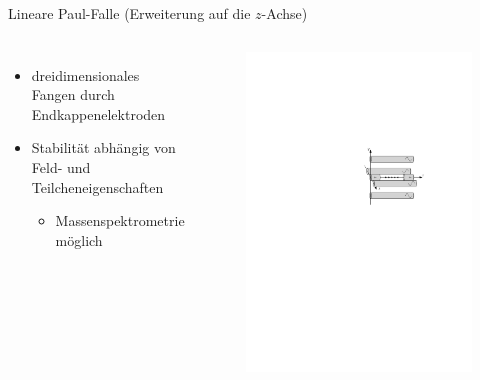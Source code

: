 \documentclass[12pt,xcolor=dvipsnames]{beamer}
\begin{document}
\begin{frame}{Lineare Paul-Falle (Erweiterung auf die $z$-Achse)}
	\begin{columns}[t]
		\begin{itemize}
				\item dreidimensionales Fangen durch Endkappenelektroden
				
				\item Stabilität abhängig von Feld- und Teilcheneigenschaften
				\begin{itemize}
					\item Massenspektrometrie möglich
				\end{itemize}
		\end{itemize}
		
			\vspace{-0.4cm}
			\begin{figure}[h]
				\centering
				\includegraphics[width=1\textwidth]{./figures/lineare_paulfalle.pdf}
			\end{figure}
	\end{columns}
	

\end{frame}
\end{document}

